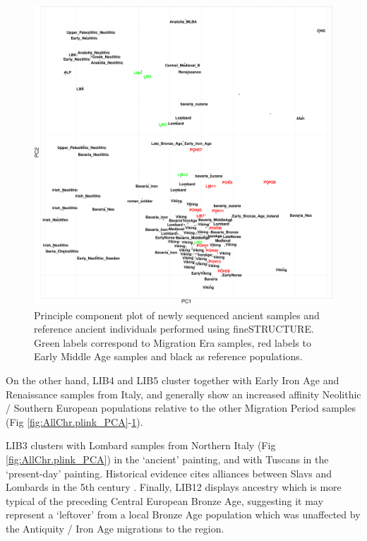 \begin{figure}[htp]
    \centering
    \includegraphics[width=1.0\textwidth]{../images/chapter5/fs_PCA.pdf}
    \caption{Principle component plot of newly sequenced ancient samples and reference ancient individuals performed using fineSTRUCTURE. Green labels correspond to Migration Era samples, red labels to Early Middle Age samples and black as reference populations.}
    \label{fig:fs_PCA}
\end{figure}

On the other hand, LIB4 and LIB5 cluster together with Early Iron Age and Renaissance samples from Italy, and generally show an increased affinity Neolithic / Southern European populations relative to the other Migration Period samples (Fig \ref{fig:AllChr.plink_PCA}-\ref{fig:fs_PCA}).

LIB3 clusters with Lombard samples from Northern Italy (Fig \ref{fig:AllChr.plink_PCA}) in the `ancient' painting, and with Tuscans in the `present-day' painting. Historical evidence cites alliances between Slavs and Lombards in the 5th century \cite{lotter2003volkerverschiebungen}. Finally, LIB12 displays ancestry which is more typical of the preceding Central European Bronze Age, suggesting it may represent a `leftover' from a local Bronze Age population which was unaffected by the Antiquity / Iron Age migrations to the region.

